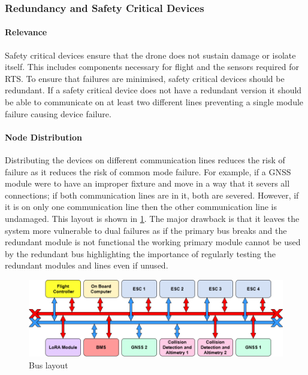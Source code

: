 \subsubsection{Redundancy and Safety Critical Devices}
\paragraph{Relevance}
Safety critical devices ensure that the drone does not sustain damage or isolate itself. This includes components necessary for flight and the sensors required for \gls{RTS}. To ensure that failures are minimised, safety critical devices should be redundant. If a safety critical device does not have a redundant version it should be able to communicate on at least two different lines preventing a single module failure causing device failure.
\paragraph{Node Distribution}
Distributing the devices on different communication lines reduces the risk of failure as it reduces the risk of common mode failure. For example, if a \gls{GNSS} module were to have an improper fixture and move in a way that it severs all connections; if both communication lines are in it, both are severed. However, if it is on only one communication line then the other communication line is undamaged. This layout is shown in \ref{fig:CAN_bus}. The major drawback is that it leaves the system more vulnerable to dual failures as if the primary bus breaks and the redundant module is not functional the working primary module cannot be used by the redundant bus highlighting the importance of regularly testing the redundant modules and lines even if unused.
 \begin{figure}[h!]
 \centering
  \includegraphics[width=1\textwidth]{figs/Thomas/Intra Communication/CAN bus.png}
 \caption{Bus layout}
 \label{fig:CAN_bus}
 \end{figure}